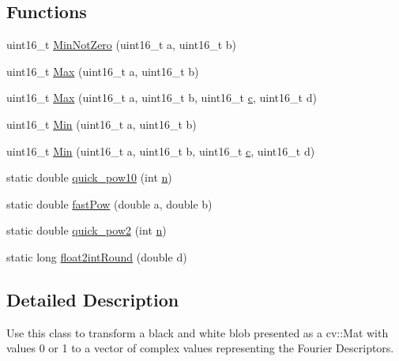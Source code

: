 \subsection*{Functions}
\begin{DoxyCompactItemize}
\item 
uint16\+\_\+t \hyperlink{namespace_soil_math_add4ac871cc7f2ece16e716a5cfa61847}{Min\+Not\+Zero} (uint16\+\_\+t a, uint16\+\_\+t b)
\item 
uint16\+\_\+t \hyperlink{namespace_soil_math_a9d385c44fb7e60a278a6eee8446f7b64}{Max} (uint16\+\_\+t a, uint16\+\_\+t b)
\item 
uint16\+\_\+t \hyperlink{namespace_soil_math_a4b71f10349d360c1d7c6313bb01c988f}{Max} (uint16\+\_\+t a, uint16\+\_\+t b, uint16\+\_\+t \hyperlink{_v_s_a___u_t_2_comparision_pictures_2_createtest_image_8m_ae0323a9039add2978bf5b49550572c7c}{c}, uint16\+\_\+t d)
\item 
uint16\+\_\+t \hyperlink{namespace_soil_math_ad458fb6889451aa72a4a7097d10490a5}{Min} (uint16\+\_\+t a, uint16\+\_\+t b)
\item 
uint16\+\_\+t \hyperlink{namespace_soil_math_a80286ce6881c7adacfba832254a8c91b}{Min} (uint16\+\_\+t a, uint16\+\_\+t b, uint16\+\_\+t \hyperlink{_v_s_a___u_t_2_comparision_pictures_2_createtest_image_8m_ae0323a9039add2978bf5b49550572c7c}{c}, uint16\+\_\+t d)
\item 
static double \hyperlink{namespace_soil_math_a1e4cf56fbcab8b4c623d6976868fbaf3}{quick\+\_\+pow10} (int \hyperlink{_v_s_a___u_t_2_comparision_pictures_2_createtest_image_8m_aeab71244afb687f16d8c4f5ee9d6ef0e}{n})
\item 
static double \hyperlink{namespace_soil_math_ab3886ae2a670a717bbe01f94543922a0}{fast\+Pow} (double a, double b)
\item 
static double \hyperlink{namespace_soil_math_a69d186af0e164a5f98c42985aabec919}{quick\+\_\+pow2} (int \hyperlink{_v_s_a___u_t_2_comparision_pictures_2_createtest_image_8m_aeab71244afb687f16d8c4f5ee9d6ef0e}{n})
\item 
static long \hyperlink{namespace_soil_math_a5b0b4bcf1fecd0f3eefc2520c624f9f4}{float2int\+Round} (double d)
\end{DoxyCompactItemize}


\subsection{Detailed Description}
Use this class to transform a black and white blob presented as a cv\+::\+Mat with values 0 or 1 to a vector of complex values representing the Fourier Descriptors. 

